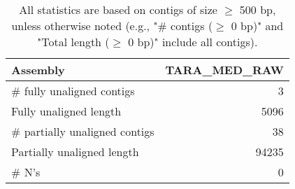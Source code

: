 \documentclass[12pt,a4paper]{article}
\begin{document}
\begin{table}[ht]
\begin{center}
\caption{All statistics are based on contigs of size $\geq$ 500 bp, unless otherwise noted (e.g., "\# contigs ($\geq$ 0 bp)" and "Total length ($\geq$ 0 bp)" include all contigs).}
\begin{tabular}{|l*{1}{|r}|}
\hline
Assembly & TARA\_MED\_RAW \\ \hline
\# fully unaligned contigs & 3 \\ \hline
Fully unaligned length & 5096 \\ \hline
\# partially unaligned contigs & 38 \\ \hline
Partially unaligned length & 94235 \\ \hline
\# N's & 0 \\ \hline
\end{tabular}
\end{center}
\end{table}
\end{document}
